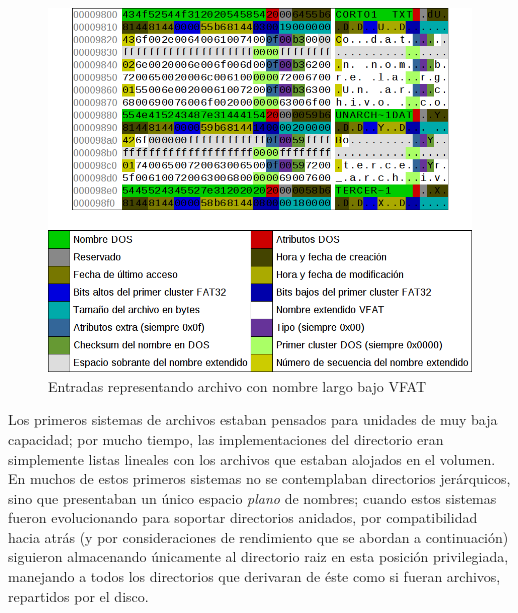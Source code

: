 \documentclass[11pt,fleqn]{book} %
\begin{document}
\begin{figure}[htb]
\centering
\includegraphics[width=\textwidth]{./img/directorio_vfat.png}
\caption{\label{FS_directorio_vfat}Entradas representando archivo con nombre largo bajo VFAT}
\end{figure}

Los primeros sistemas de archivos estaban pensados para unidades de
muy baja capacidad; por mucho tiempo, las implementaciones del
directorio eran simplemente listas lineales con los archivos que
estaban alojados en el volumen. En muchos de estos primeros sistemas
no se contemplaban directorios jerárquicos, sino que presentaban un
único espacio \emph{plano} de nombres; cuando estos sistemas fueron
evolucionando para soportar directorios anidados, por compatibilidad
hacia atrás (y por consideraciones de rendimiento que se abordan a
continuación) siguieron almacenando únicamente al directorio raiz en
esta posición privilegiada, manejando a todos los directorios que
derivaran de éste como si fueran archivos, repartidos por el disco.
\end{document}
